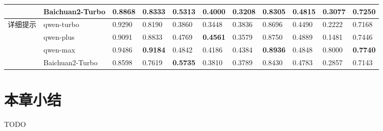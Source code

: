 \begin{table}[]
{\begin{tabular}{llllllllll|l}
                               & Baichuan2-Turbo & 0.8868          & 0.8333          & 0.5313          & 0.4000          & 0.3208          & 0.8305          & 0.4815          & 0.3077          & 0.7250          \\
        \midrule
        \multirow{4}{*}{详细提示}  & qwen-turbo      & 0.9290          & 0.8190          & 0.3860          & 0.3448          & 0.3836          & 0.8696          & 0.4490          & 0.2222          & 0.7168          \\
                               & qwen-plus       & 0.9091          & 0.8833          & 0.4769          & \textbf{0.4561} & 0.3579          & 0.8750          & 0.4889          & 0.1481          & 0.7446          \\
                               & qwen-max        & 0.9486          & \textbf{0.9184} & 0.4842          & 0.4186          & 0.4384          & \textbf{0.8936} & 0.4848          & 0.8000          & \textbf{0.7740} \\
                               & Baichuan2-Turbo & 0.8598          & 0.7619          & \textbf{0.5735} & 0.3810          & 0.3789          & 0.8430          & 0.4783          & 0.2857          & 0.7143          \\
        \bottomrule
        \end{tabular}%
    }
\end{table}

\section{本章小结}

TODO